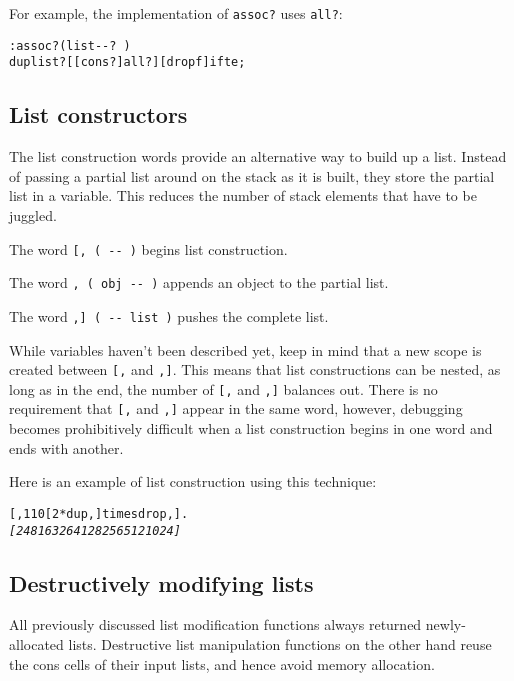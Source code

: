\documentclass[english]{article}
\begin{document}
For example, the implementation of \texttt{assoc?} uses \texttt{all?}:

\begin{alltt}
: assoc? ( list -{}- ?~)
    dup list? {[} {[} cons? {]} all? {]} {[} drop f {]} ifte ;
\end{alltt}

\subsection{\label{sub:List-constructors}List constructors}

The list construction words provide an alternative way to build up a list. Instead of passing a partial list around on the stack as it is built, they store the partial list in a variable. This reduces the number
of stack elements that have to be juggled.

The word \texttt{{[}, ( -{}- )} begins list construction.

The word \texttt{, ( obj -{}- )} appends an object to the partial
list.

The word \texttt{,{]} ( -{}- list )} pushes the complete list.

While variables haven't been described yet, keep in mind that a new
scope is created between \texttt{{[},} and \texttt{,{]}}. This means
that list constructions can be nested, as long as in the end, the
number of \texttt{{[},} and \texttt{,{]}} balances out. There is no
requirement that \texttt{{[},} and \texttt{,{]}} appear in the same
word, however, debugging becomes prohibitively difficult when a list
construction begins in one word and ends with another.

Here is an example of list construction using this technique:

\begin{alltt}
{[}, 1 10 {[} 2 {*} dup , {]} times drop ,{]} .
\emph{{[} 2 4 8 16 32 64 128 256 512 1024 {]}}
\end{alltt}

\subsection{\label{sub:Destructively-modifying-lists}Destructively modifying lists}

All previously discussed list modification functions always returned
newly-allocated lists. Destructive list manipulation functions on
the other hand reuse the cons cells of their input lists, and hence
avoid memory allocation.
\end{document}
